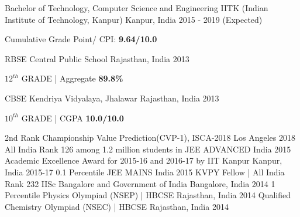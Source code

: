 \documentclass[12pt, a4paper]{awesome-cv}
\begin{document}
\makecvheader
\begin{cventries}
  \cventry
    {Bachelor of Technology, Computer Science and Engineering}
    {IITK (Indian Institute of Technology, Kanpur)}
    {Kanpur, India}
    {2015 - 2019 (Expected)}
    {
      \begin{cvitems}
        \item {Cumulative Grade Point/ CPI:\textbf{ 9.64/10.0} }
      \end{cvitems}
    }
    \vspace{0.2cm}
  \cventry
    {RBSE}
    {Central Public School}
    {Rajasthan, India}
    {2013}
    {
      \begin{cvitems}
        \item {$12 ^{th}$ GRADE | Aggregate \textbf{89.8\%}}      
      \end{cvitems} 
    }
    \vspace{0.2cm}
  \cventry
    {CBSE}
    {Kendriya Vidyalaya, Jhalawar}
    {Rajasthan, India}
    {2013}
    {
      \begin{cvitems}
        \item {$10 ^{th}$ GRADE | CGPA \textbf{10.0/10.0}}      
      \end{cvitems} 
    }

\end{cventries}
\vspace{-0.3cm}
\begin{cvhonors}
  \cvhonor
    {2nd Rank}
    {Championship Value Prediction(CVP-1), ISCA-2018}
    {Los Angeles}
    {2018}
  \cvhonor
    {All India Rank 126}
    {among 1.2 million students in JEE ADVANCED}
    {India}
    {2015}
  \cvhonor
    {Academic Excellence Award}
    {for 2015-16 and 2016-17 by IIT Kanpur}
    {Kanpur, India}
    {2015-17}
  \cvhonor
    {0.1 Percentile}
    {JEE MAINS}
    {India}
    {2015}
  \cvhonor
    {KVPY Fellow | All India Rank 232}
    {IISc Bangalore and Government of India}
    {Bangalore, India}
    {2014}
  \cvhonor
    {1 Percentile}
    {Physics Olympiad (NSEP) | HBCSE}    
    {Rajasthan, India}
    {2014}  
  \cvhonor
    {Qualified}
    {Chemistry Olympiad (NSEC) | HBCSE}
    {Rajasthan, India}
    {2014}

\end{cvhonors}
\end{document}
